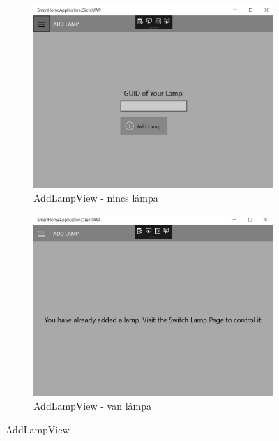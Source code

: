 \documentclass[a4paper,12pt]{report}
\begin{document}
    \begin{figure}[H]
        \centering
        \begin{subfigure}[b]{0.4\linewidth}
            \includegraphics[width=\linewidth]{images/addlampview.jpg}
            \caption{AddLampView - nincs lámpa}
        \end{subfigure}
        \begin{subfigure}[b]{0.4\linewidth}
            \includegraphics[width=\linewidth]{images/alreadyhaslamp.jpg}
            \caption{AddLampView - van lámpa}
        \end{subfigure}
        \caption{AddLampView}
        \label{fig:AddLamp}
    \end{figure}
\end{document}
